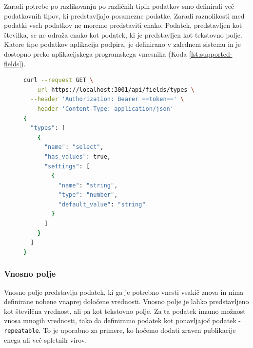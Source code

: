 \documentclass[a4paper, 12pt]{book}
\begin{document}
Zaradi potrebe po razlikovanju po različnih tipih podatkov smo definirali več podatkovnih tipov, ki predstavljajo posamezne podatke. Zaradi raznolikosti med podatki vseh podatkov ne moremo predstaviti enako. Podatek, predstavljen kot številka, se ne odraža enako kot podatek, ki je predstavljen kot tekstovno polje. Katere tipe podatkov aplikacija podpira, je definirano v zalednem sistemu in je dostopno preko aplikacijskega programskega vmesnika (Koda \ref{lst:supported-fields}). 

\begin{figure}[h]
    \centering
    \begin{lstlisting}[language=bash, style=mystyle,caption={Izsek aplikacijskega vmesnika za pridobitev vseh podprtih podatkovnih tipov v aplikaciji},label=lst:supported-fields]
curl --request GET \
  --url https://localhost:3001/api/fields/types \
  --header 'Authorization: Bearer ==token==' \
  --header 'Content-Type: application/json'
{
  "types": [
    {
      "name": "select",
      "has_values": true,
      "settings": [
        {
          "name": "string",
          "type": "number",
          "default_value": "string"
        }
      ]
    }
  ]
}
\end{lstlisting}
\end{figure}




\subsubsection{Vnosno polje}
Vnosno polje predstavlja podatek, ki ga je potrebno vnesti vsakič znova in nima definirane nobene vnaprej določene vrednosti. Vnosno polje je lahko predstavljeno kot številčna vrednost, ali pa kot tekstovno polje. 
Za ta podatek imamo možnost vnosa mnogih vrednosti, tako da definiramo podatek kot ponavljajoč podatek - \verb=repeatable=. To je uporabno za primere, ko hočemo dodati zraven publikacije enega ali več spletnih virov.
\end{document}
